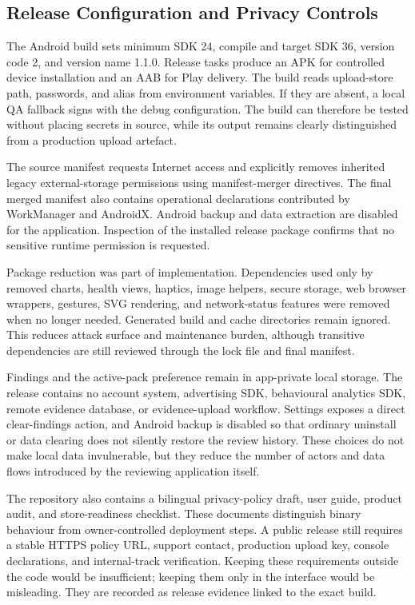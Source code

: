 \subsection{Release Configuration and Privacy Controls}

The Android build sets minimum SDK 24, compile and target SDK 36, version code 2, and version name 1.1.0. Release tasks produce an APK for controlled device installation and an AAB for Play delivery. The build reads upload-store path, passwords, and alias from environment variables. If they are absent, a local QA fallback signs with the debug configuration. The build can therefore be tested without placing secrets in source, while its output remains clearly distinguished from a production upload artefact.

The source manifest requests Internet access and explicitly removes inherited legacy external-storage permissions using manifest-merger directives. The final merged manifest also contains operational declarations contributed by WorkManager and AndroidX. Android backup and data extraction are disabled for the application. Inspection of the installed release package confirms that no sensitive runtime permission is requested.

Package reduction was part of implementation. Dependencies used only by removed charts, health views, haptics, image helpers, secure storage, web browser wrappers, gestures, SVG rendering, and network-status features were removed when no longer needed. Generated build and cache directories remain ignored. This reduces attack surface and maintenance burden, although transitive dependencies are still reviewed through the lock file and final manifest.

Findings and the active-pack preference remain in app-private local storage. The release contains no account system, advertising SDK, behavioural analytics SDK, remote evidence database, or evidence-upload workflow. Settings exposes a direct clear-findings action, and Android backup is disabled so that ordinary uninstall or data clearing does not silently restore the review history. These choices do not make local data invulnerable, but they reduce the number of actors and data flows introduced by the reviewing application itself.

The repository also contains a bilingual privacy-policy draft, user guide, product audit, and store-readiness checklist. These documents distinguish binary behaviour from owner-controlled deployment steps. A public release still requires a stable HTTPS policy URL, support contact, production upload key, console declarations, and internal-track verification. Keeping these requirements outside the code would be insufficient; keeping them only in the interface would be misleading. They are recorded as release evidence linked to the exact build.

